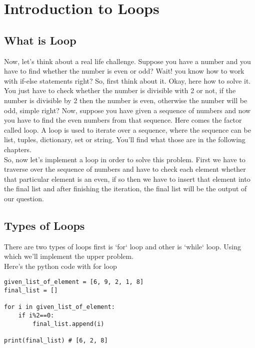 \chapter{Introduction to Loops}
\section{What is Loop}
\noindent Now, let's think about a real life challenge. Suppose you have a number and you have to find whether the number is even or odd? Wait! you know how to work with if-else statements right? So, first think about it. Okay, here how to solve it. You just have to check whether the number is divisible with 2 or not, if the number is divisible by 2 then the number is even, otherwise the number will be odd, simple right? Now, suppose you have given a sequence of numbers and now you have to find the even numbers from that sequence. Here comes the factor called loop. A loop is used to iterate over a sequence, where the sequence can be list, tuples, dictionary, set or string. You'll find what those are in the following chapters.\\

So, now let's implement a loop in order to solve this problem. First we have to traverse over the sequence of numbers and have to check each element whether that particular element is an even, if so then we have to insert that element into the final list and after finishing the iteration, the final list will be the output of our question.\\

\section{Types of Loops}
There are two types of loops first is `for` loop and other is `while` loop. Using which we'll implement the upper problem.\\

\noindent Here's the python code with for loop

\noindent\begin{minipage}{\linewidth}
\begin{lstlisting}[style=python]
given_list_of_element = [6, 9, 2, 1, 8]
final_list = []

for i in given_list_of_element:
    if i%2==0:
        final_list.append(i)
        
print(final_list) # [6, 2, 8]
\end{lstlisting}
\end{minipage}

